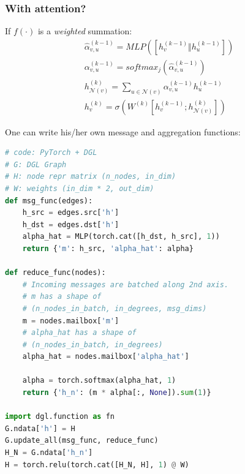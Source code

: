 \documentclass[10pt,aspectratio=169]{beamer}
\begin{document}
	\begin{frame}[fragile]
		\frametitle{With attention?}
		\begin{minipage}{0.4\textwidth}
			If $f(\cdot)$ is a \emph{weighted} summation:
			$$
			\begin{gathered}
			\hat\alpha ^{(k-1)}_{v,u} = MLP\left(\left[h_v^{(k-1)} \Vert h_u^{(k-1)}\right]\right) \\
			\alpha^{(k-1)}_{v,u} = softmax_j\left(
			\hat\alpha ^{(k-1)}_{v,u}
			\right)\\
			h_{\mathcal{N}(v)}^{(k)} =
			\sum_{u \in \mathcal{N}(v)} \alpha^{(k-1)}_{v,u} h^{(k-1)}_u \\
			h^{(k)}_v =
			\sigma \left( W^{(k)} \left[h_v^{(k-1)}; h_{\mathcal{N}(v)}^{(k)}\right] \right)
			\end{gathered}
			$$
		\end{minipage}\hfill%
		\begin{minipage}{0.5\textwidth}
			One can write his/her own message and aggregation functions:
\begin{lstlisting}[language=Python]
# code: PyTorch + DGL
# G: DGL Graph
# H: node repr matrix (n_nodes, in_dim)
# W: weights (in_dim * 2, out_dim)
def msg_func(edges):
    h_src = edges.src['h']
    h_dst = edges.dst['h']
    alpha_hat = MLP(torch.cat([h_dst, h_src], 1))
    return {'m': h_src, 'alpha_hat': alpha}

def reduce_func(nodes):
    # Incoming messages are batched along 2nd axis.
    # m has a shape of
    # (n_nodes_in_batch, in_degrees, msg_dims)
    m = nodes.mailbox['m']
    # alpha_hat has a shape of
    # (n_nodes_in_batch, in_degrees)
    alpha_hat = nodes.mailbox['alpha_hat']
    
    alpha = torch.softmax(alpha_hat, 1)
    return {'h_n': (m * alpha[:, None]).sum(1)}

import dgl.function as fn
G.ndata['h'] = H
G.update_all(msg_func, reduce_func)
H_N = G.ndata['h_n']
H = torch.relu(torch.cat([H_N, H], 1) @ W)
\end{lstlisting}
		\end{minipage}
	\end{frame}
\end{document}
